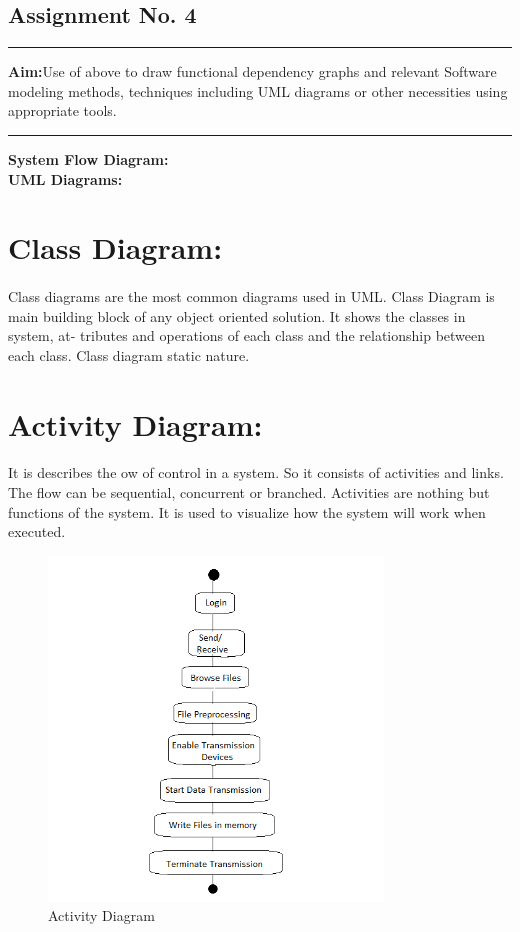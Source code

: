 \documentclass[11pt,a4paper]{report}
\begin{document}
\begin{center}
\section*{Assignment No. 4}
\end{center}
\rule{\textwidth}{1pt}
\textbf{Aim:}Use of above to draw functional dependency graphs and relevant Software modeling methods, techniques including UML diagrams or other necessities using appropriate tools.
\newline
\rule{\textwidth}{1pt}

\textbf{System Flow Diagram:\\}
\textbf{UML Diagrams:\\}
\section*{Class Diagram:}
\paragraph{}Class diagrams are the most common diagrams used in UML. Class Diagram is main building block of any object oriented solution. It shows the classes in system, at- tributes and operations of each class and the relationship between each class. Class diagram static nature.
\section*{Activity Diagram:}
\paragraph{}It is describes the ow of control in a system. So it consists of activities and links. The flow can be sequential, concurrent or branched. Activities are nothing but functions of the system. It is used to visualize how the system will work when executed.
\begin{figure}[h]
	\centering
	\includegraphics[width=3.5in]{Activity.png}
	\begin{center}\caption{Activity Diagram} \end{center}
	\label{LABEL}
\end{figure}
\end{document}
